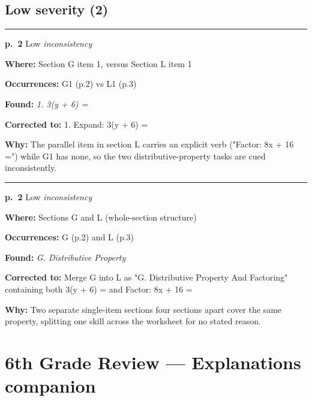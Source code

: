 \documentclass[11pt]{article}
\newcommand{\sevlow}[1]{\textcolor{black!55}{#1}}
\begin{document}
\subsection*{Low severity (2)}
\noindent\rule{\textwidth}{0.4pt}\par\nobreak\vspace{2pt}
\noindent\textbf{p.~2} \quad \sevlow{Low} \quad \textit{inconsistency}\par
\noindent\textbf{Where: }Section G item 1, versus Section L item 1\par
\noindent\textbf{Occurrences: }G1 (p.2) vs L1 (p.3)\par
\noindent\textbf{Found: }\textit{1. 3(y + 6) =}\par
\noindent\textbf{Corrected to: }1. Expand: 3(y + 6) =\par
\noindent\textbf{Why: }The parallel item in section L carries an explicit verb ("Factor: 8x + 16 =") while G1 has none, so the two distributive-property tasks are cued inconsistently.\par\vspace{4pt}
\noindent\rule{\textwidth}{0.4pt}\par\nobreak\vspace{2pt}
\noindent\textbf{p.~2} \quad \sevlow{Low} \quad \textit{inconsistency}\par
\noindent\textbf{Where: }Sections G and L (whole-section structure)\par
\noindent\textbf{Occurrences: }G (p.2) and L (p.3)\par
\noindent\textbf{Found: }\textit{G. Distributive Property}\par
\noindent\textbf{Corrected to: }Merge G into L as "G. Distributive Property And Factoring" containing both 3(y + 6) = and Factor: 8x + 16 =\par
\noindent\textbf{Why: }Two separate single-item sections four sections apart cover the same property, splitting one skill across the worksheet for no stated reason.\par\vspace{4pt}
\newpage\section*{6th Grade Review --- Explanations companion}
\end{document}
